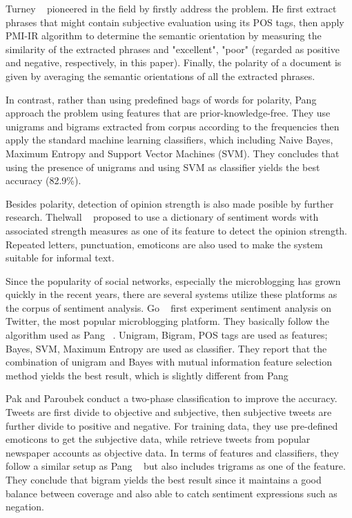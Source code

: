\documentclass[12pt]{article}
\begin{document}
Turney \etal~\cite{Turney:02} pioneered in the field by firstly address the problem. He first extract phrases that might contain subjective evaluation using its POS tags, then apply PMI-IR algorithm \cite{Turney:01} to determine the semantic orientation by measuring the similarity of the extracted phrases and "excellent", "poor" (regarded as positive and negative, respectively, in this paper). Finally, the polarity of a document is given by averaging the semantic orientations of all the extracted phrases.

In contrast, rather than using predefined bags of words for polarity, Pang \etal~\cite{Pang:02} approach the problem using features that are prior-knowledge-free. They use unigrams and bigrams extracted from corpus according to the frequencies then apply the standard machine learning classifiers, which including Naive Bayes, Maximum Entropy and Support Vector Machines (SVM). They concludes that using the presence of unigrams and using SVM as classifier yields the best accuracy (82.9\%).

Besides polarity, detection of opinion strength is also made posible by further research. Thelwall \etal~\cite{Thelwall:10} proposed to use a dictionary of sentiment words with associated strength measures as one of its feature to detect the opinion strength. Repeated letters, punctuation, emoticons are also used to make the system suitable for informal text.

Since the popularity of social networks, especially the microblogging has grown quickly in the recent years, there are several systems utilize these platforms as the corpus of sentiment analysis. Go \etal~\cite{Go:09} first experiment sentiment analysis on Twitter, the most popular microblogging platform. They basically follow the algorithm used as Pang \etal~\cite{Pang:02}. Unigram, Bigram, POS tags are used as features; Bayes, SVM, Maximum Entropy are used as classifier. They report that the combination of unigram and Bayes with mutual information feature selection method yields the best result, which is slightly different from Pang \etal~\cite{Pang:02}

Pak and Paroubek \cite{Pak:10} conduct a two-phase classification to improve the accuracy. Tweets are first divide to objective and subjective, then subjective tweets are further divide to positive and negative. For training data, they use pre-defined emoticons to get the subjective data, while retrieve tweets from popular newspaper accounts as objective data. In terms of features and classifiers, they follow a similar setup as Pang \etal~\cite{Pang:02} but also includes trigrams as one of the feature. They conclude that bigram yields the best result since it maintains a good balance between coverage and also able to catch sentiment expressions such as negation.
\end{document}

